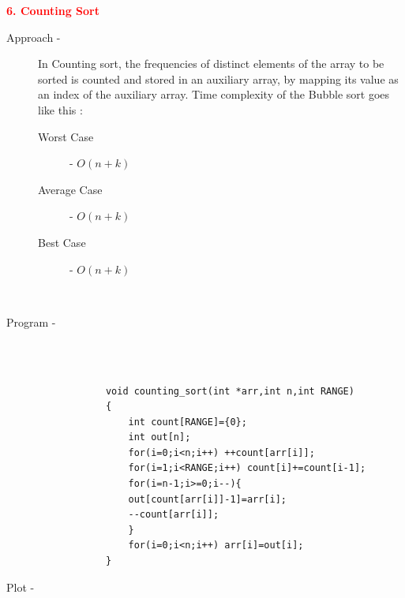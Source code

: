 \documentclass[0pt]{article}
\begin{document}
	
	
	
	
	
	
	
	
	
	
	
	
	
	
	
	
	
	
	
	
	
	
	
	
	\begin{flushleft}
		\textbf{\textcolor{red}{6. Counting Sort}}
		\leavevmode \\
		\begin{description}
			\item[Approach - ] In Counting sort, the frequencies of distinct elements of the array to be sorted is counted and stored in an auxiliary array, by mapping its value as an index of the auxiliary array. Time complexity of the Bubble sort goes like this :  
			\leavevmode \\
			\begin{description}
				\item[Worst Case] - \(O(n+k)\)
				\item[Average Case] - \(O(n+k)\)
				\item[Best Case] - \(O(n+k)\)
			\end{description}
			\leavevmode \\
			\item[Program - ] \leavevmode \\
			\leavevmode \\
			\begin{lstlisting}
			void counting_sort(int *arr,int n,int RANGE)
			{
				int count[RANGE]={0};
				int out[n];
				for(i=0;i<n;i++) ++count[arr[i]];
				for(i=1;i<RANGE;i++) count[i]+=count[i-1];
				for(i=n-1;i>=0;i--){
				out[count[arr[i]]-1]=arr[i];
				--count[arr[i]];
				}
				for(i=0;i<n;i++) arr[i]=out[i];
			}
			\end{lstlisting}
			\item[Plot - ] \leavevmode \\
		\end{description}
	\end{flushleft}
	\begin{center}
	\end{center}
	\leavevmode \\
	
\end{document}
